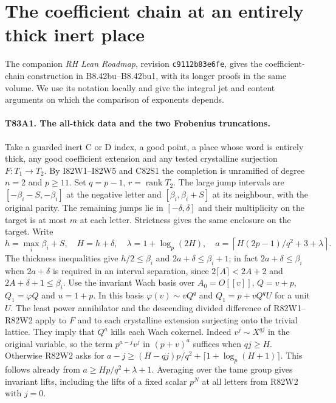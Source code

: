 \section{The coefficient chain at an entirely thick inert place}

The companion \emph{RH Lean Roadmap}, revision
\texttt{c9112b83e6fe}, gives the coefficient-chain construction
in B8.42bu--B8.42bu1, with its longer proofs in the same volume.
We use its notation locally and give the integral jet and content
arguments on which the comparison of exponents depends.

\paragraph{T83A1. The all-thick data and the two Frobenius truncations.}
Take a guarded inert C or D index, a good point, a place whose
word is entirely thick, any good coefficient extension and any tested
crystalline surjection $F:T_1\to T_2$. By I82W1--I82W5 and C82S1
the completion is unramified of degree $n=2$ and $p\ge11$.
Set $q=p-1$, $r=\operatorname{rank}T_2$. The large jump intervals
are $[-\beta_i-S,-\beta_i]$ at the negative letter and
$[\beta_i,\beta_i+S]$ at its neighbour, with the original parity.
The remaining jumps lie in $[-\delta,\delta]$ and their
multiplicity on the target is at most $m$ at each letter.
Strictness gives the same enclosure on the target. Write
\[
 h=\max_i\beta_i+S,\quad H=h+\delta,\quad
 \lambda=1+\log_p(2H),\quad
 a=\left\lceil H(2p-1)/q^2+3+\lambda\right\rceil .
\]
The thickness inequalities give $h/2\le\beta_i$ and
$2a+\delta\le\beta_i+1$; in fact $2a+\delta\le\beta_i$
when $2a+\delta$ is required in an interval separation, since
$2\lceil A\rceil<2A+2$ and $2A+\delta+1\le\beta_i$.
Use the invariant Wach basis over $A_0=O[[v]]$, $Q=v+p$,
$Q_1=\varphi Q$ and $u=1+p$. In this basis
$\varphi(v)\sim vQ^q$ and $Q_1=p+vQ^qU$ for a unit $U$.
The least power annihilator and the descending divided difference
of R82W1--R82W2 apply to $F$ and to each crystalline extension
surjecting onto the trivial lattice. They imply that $Q^a$ kills
each Wach cokernel. Indeed $v^j\sim X^{qj}$ in the original
variable, so the term $p^{a-j}v^j$ in $(p+v)^a$ suffices when
$qj\ge H$. Otherwise R82W2 asks for
$a-j\ge(H-qj)p/q^2+\lceil1+\log_p(H+1)\rceil$.
This follows already from $a\ge Hp/q^2+\lambda+1$.
Averaging over the tame group gives invariant lifts, including the
lifts of a fixed scalar $p^N$ at all letters from R82W2 with $j=0$.

